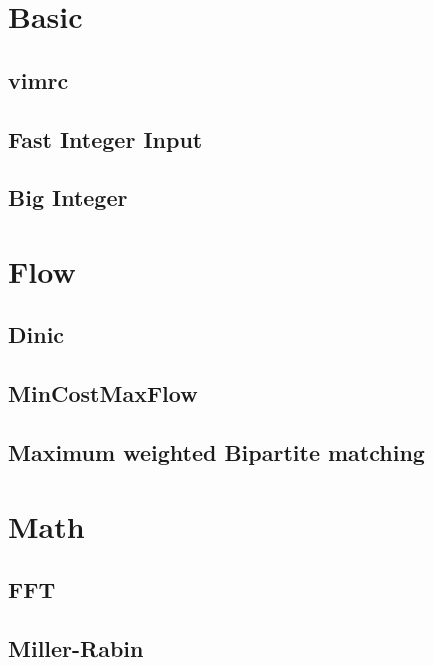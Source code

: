 \documentclass[a4paper,10pt,twocolumn,oneside]{article}
\begin{document}
\pagestyle{fancy}
\fancyfoot{}
\fancyhead[R]{\thepage}
\renewcommand{\headrulewidth}{0.4pt}
\renewcommand{\contentsname}{Contents} 

\scriptsize
\tableofcontents
\newpage
\section{Basic}
\subsection{vimrc}

\subsection{Fast Integer Input}

\subsection{Big Integer}

\section{Flow}
\subsection{Dinic}

\subsection{MinCostMaxFlow}

\subsection{Maximum weighted Bipartite matching}

\section{Math}
\subsection{FFT}

\subsection{Miller-Rabin}

\end{document}
